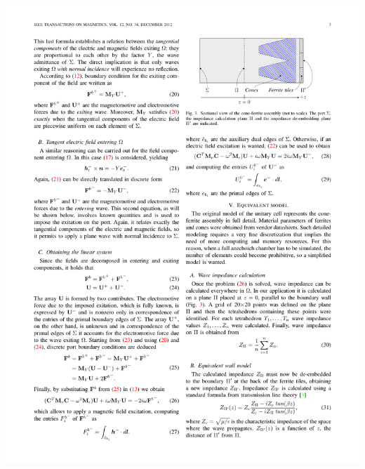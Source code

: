\documentclass[portrait,fontscale=0.35,paperwidth=800mm, paperheight=1200mm]{baposter}
\begin{document}
\begin{poster}
{        \begin{minipage}{\textwidth}
            \hfill
            \begin{minipage}[b]{0.40\textwidth}
            \begin{center}
                \includegraphics[width=\textwidth]{img/cell_section_poster.pdf}
                \label{fig:unitcell-sec}
            \end{center}
            \end{minipage}
            \hfill
            \begin{minipage}[b]{0.41\textwidth}
                \begin{center}

\end{center}
\end{minipage}
\end{minipage}}
\end{poster}
\end{document}
